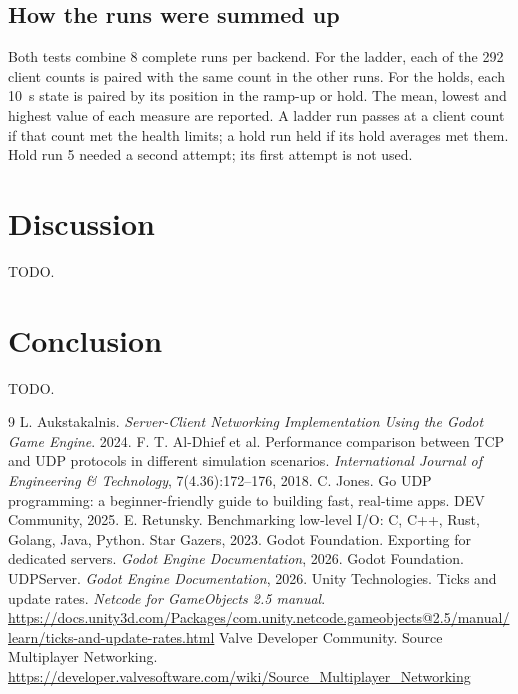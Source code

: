 \subsection{How the runs were summed up}
Both tests combine 8 complete runs per backend. For the ladder, each of the 292 client counts is paired with the same count in the other runs. For the holds, each 10~s state is paired by its position in the ramp-up or hold. The mean, lowest and highest value of each measure are reported. A ladder run passes at a client count if that count met the health limits; a hold run held if its hold averages met them. Hold run 5 needed a second attempt; its first attempt is not used.

\section{Discussion}
TODO.

\section{Conclusion}
TODO.

\begin{thebibliography}{9}
 L. Aukstakalnis. \emph{Server-Client Networking Implementation Using the Godot Game Engine}. 2024.
 F. T. Al-Dhief et al. Performance comparison between TCP and UDP protocols in different simulation
scenarios. \emph{International Journal of Engineering \& Technology}, 7(4.36):172--176, 2018.
 C. Jones. Go UDP programming: a beginner-friendly guide to building fast, real-time apps. DEV Community, 2025.
 E. Retunsky. Benchmarking low-level I/O: C, C++, Rust, Golang, Java, Python. Star Gazers, 2023.
 Godot Foundation. Exporting for dedicated servers. \emph{Godot Engine Documentation}, 2026.
 Godot Foundation. UDPServer. \emph{Godot Engine Documentation}, 2026.
 Unity Technologies. Ticks and update rates. \emph{Netcode for GameObjects 2.5 manual}.
\url{https://docs.unity3d.com/Packages/com.unity.netcode.gameobjects@2.5/manual/learn/ticks-and-update-rates.html}
 Valve Developer Community. Source Multiplayer Networking.
\url{https://developer.valvesoftware.com/wiki/Source_Multiplayer_Networking}
\end{thebibliography}


